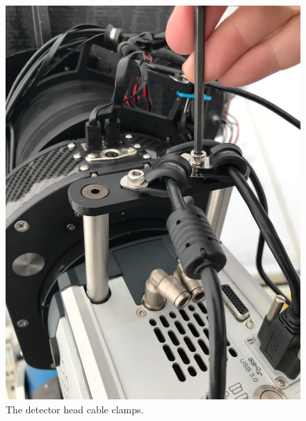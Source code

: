 \begin{enumerate}
\begin{figure}
\begin{center}
\includegraphics[angle=0,width=0.8\linewidth]{figures/huitzi-f20-detector-cable-clamps.jpg}
\end{center}
\caption{The detector head cable clamps.}
\label{figure:huitzi-f20-detector-cable-clamps}
\end{figure}


\end{enumerate}

